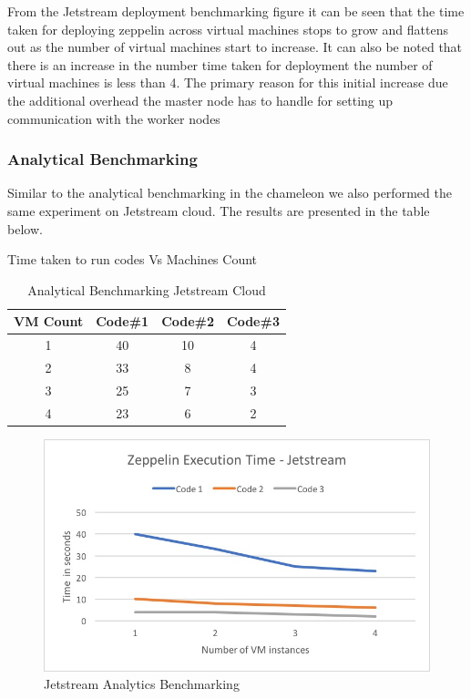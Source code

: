\documentclass[9pt,twocolumn,twoside]{../../styles/osajnl}
\begin{document}
	From the Jetstream deployment benchmarking figure it can be seen 
	that 
	the time taken for deploying zeppelin across virtual machines 
	stops 
	to grow and flattens out as the number of virtual machines start 
	to 
	increase. It can also be noted that there is an increase in the 
	number time taken for deployment the number of virtual machines 
	is 
	less than 4. The primary reason for this initial increase due the 
	additional overhead the master node has to handle for setting up 
	communication with the worker nodes
	
	\subsubsection{Analytical Benchmarking}
	
	Similar to the analytical benchmarking in the chameleon we also 
	performed the same experiment on Jetstream cloud. The results are 
	presented in the table below.
	
	\begin{table}[ht]
		\caption{Analytical Benchmarking Jetstream Cloud} %
		\centering %
		Time taken to run codes Vs Machines Count \\
		\begin{tabular}{c c c c} %
			\hline
			\hline %
			VM Count & Code\#1 & Code\#2 & Code\#3 \\ [0.5ex] %
			\hline %
			1 & 40 & 10 & 4 \\ %
			2 & 33 & 8 & 4 \\
			3 & 25 & 7 & 3 \\
			4 & 23 & 6 & 2 \\ [1ex] %
			\hline %
		\end{tabular}
		\label{table:nonlin} %
	\end{table}
	
	\begin{figure}
		\includegraphics[width=\linewidth]{./images/Jetstream_analytic_benchmark}
		\caption{Jetstream Analytics Benchmarking}
		\label{fig:Jetstream Analytics Benchmarking}
	\end{figure}
\end{document}

